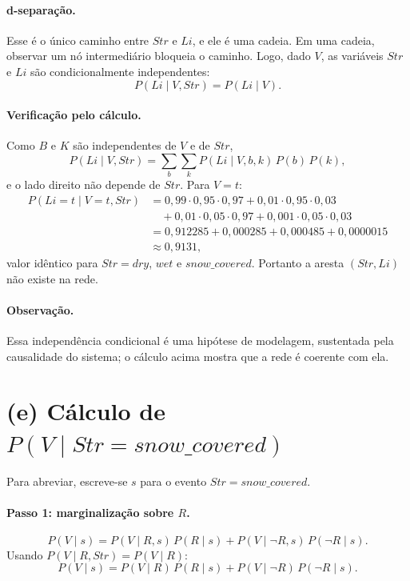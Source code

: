 \documentclass[12pt,a4paper]{article}
\newcommand{\Str}{\mathit{Str}}
\newcommand{\Li}{\mathit{Li}}
\newcommand{\snow}{\mathit{snow\_covered}}
\begin{document}
\paragraph{d-separação.} Esse é o único caminho entre $\Str$ e $\Li$, e ele é uma
cadeia. Em uma cadeia, observar um nó intermediário bloqueia o caminho. Logo, dado
$V$, as variáveis $\Str$ e $\Li$ são condicionalmente independentes:
\[
P(\Li \mid V, \Str) = P(\Li \mid V).
\]

\paragraph{Verificação pelo cálculo.} Como $B$ e $K$ são independentes de $V$ e de
$\Str$,
\[
P(\Li \mid V, \Str) = \sum_{b}\sum_{k} P(\Li \mid V, b, k)\, P(b)\, P(k),
\]
e o lado direito não depende de $\Str$. Para $V = t$:
\begin{align*}
P(\Li = t \mid V = t, \Str)
 &= 0{,}99 \cdot 0{,}95 \cdot 0{,}97 + 0{,}01 \cdot 0{,}95 \cdot 0{,}03 \\
 &\quad + 0{,}01 \cdot 0{,}05 \cdot 0{,}97 + 0{,}001 \cdot 0{,}05 \cdot 0{,}03 \\
 &= 0{,}912285 + 0{,}000285 + 0{,}000485 + 0{,}0000015 \\
 &\approx 0{,}9131 ,
\end{align*}
valor idêntico para $\Str = \mathit{dry}$, $\mathit{wet}$ e $\snow$. Portanto a
aresta $(\Str, \Li)$ não existe na rede.

\paragraph{Observação.} Essa independência condicional é uma hipótese de modelagem,
sustentada pela causalidade do sistema; o cálculo acima mostra que a rede é coerente
com ela.

\section*{(e) Cálculo de $P(V \mid \Str = \snow)$}

Para abreviar, escreve-se $s$ para o evento $\Str = \snow$.
\renewcommand{\snow}{s}

\paragraph{Passo 1: marginalização sobre $R$.}
\[
P(V \mid \snow) = P(V \mid R, \snow)\, P(R \mid \snow)
                + P(V \mid \neg R, \snow)\, P(\neg R \mid \snow).
\]
Usando $P(V \mid R, \Str) = P(V \mid R)$:
\[
P(V \mid \snow) = P(V \mid R)\, P(R \mid \snow) + P(V \mid \neg R)\, P(\neg R \mid \snow).
\]
\end{document}
